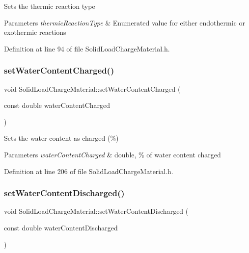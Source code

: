 Sets the thermic reaction type 
\begin{DoxyParams}{Parameters}
{\em thermic\+Reaction\+Type} & Enumerated value for either endothermic or exothermic reactions \\
\hline
\end{DoxyParams}


Definition at line 94 of file Solid\+Load\+Charge\+Material.\+h.

\mbox{\label{class_solid_load_charge_material_abf43422318a1b9120dff1dcfb15d5265}} 
\subsubsection{\texorpdfstring{set\+Water\+Content\+Charged()}{setWaterContentCharged()}}
{\footnotesize\ttfamily void Solid\+Load\+Charge\+Material\+::set\+Water\+Content\+Charged (\begin{DoxyParamCaption}\item[{const double}]{water\+Content\+Charged }\end{DoxyParamCaption})\hspace{0.3cm}{\ttfamily [inline]}}

Sets the water content as charged (\%) 
\begin{DoxyParams}{Parameters}
{\em water\+Content\+Charged} & double, \% of water content charged \\
\hline
\end{DoxyParams}


Definition at line 206 of file Solid\+Load\+Charge\+Material.\+h.

\mbox{\label{class_solid_load_charge_material_a5104ddb43af977a751b90a0bc844d83d}} 
\subsubsection{\texorpdfstring{set\+Water\+Content\+Discharged()}{setWaterContentDischarged()}}
{\footnotesize\ttfamily void Solid\+Load\+Charge\+Material\+::set\+Water\+Content\+Discharged (\begin{DoxyParamCaption}\item[{const double}]{water\+Content\+Discharged }\end{DoxyParamCaption})\hspace{0.3cm}{\ttfamily [inline]}}

